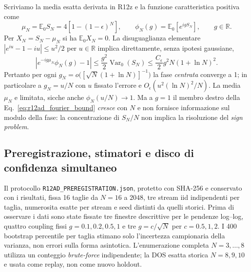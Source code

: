 \documentclass[11pt,a4paper]{article}
\begin{document}
Scriviamo la media esatta derivata in R12z e la funzione caratteristica positiva come
\begin{equation}
 \mu_N=\mathbb E_0 S_N=4[1-(1-\epsilon)^N],\qquad
 \phi_N(g)=\mathbb E_0[e^{igS_N}],\qquad g\in\mathbb R.
 \label{eq:r12ad_def}
\end{equation}
Per $X_N=S_N-\mu_N$ si ha $\mathbb E_0 X_N=0$. La disuguaglianza elementare $|e^{iu}-1-iu|\le u^2/2$ per $u\in\mathbb R$ implica direttamente, senza ipotesi gaussiane,
\begin{equation}
 \boxed{\left|e^{-ig\mu_N}\phi_N(g)-1\right|\le
 \frac{g^2}{2}\operatorname{Var}_0(S_N)
 \le \frac{C_\epsilon}{2}g^2N(1+\ln N)^2.}
 \label{eq:r12ad_fourier_bound}
\end{equation}
Pertanto per ogni $g_N=o\bigl([\sqrt N(1+\ln N)]^{-1}\bigr)$ la fase \emph{centrata} converge a 1; in particolare a $g_N=u/N$ con $u$ fissato l'errore e $O_\epsilon(u^2(\ln N)^2/N)$. La media $\mu_N$ e limitata, sicche anche $\phi_N(u/N)\to1$. Ma a $g=1$ il membro destro della Eq.~\eqref{eq:r12ad_fourier_bound} \emph{cresce} con $N$ e non fornisce informazione sul modulo della fase: la concentrazione di $S_N/N$ non implica la risoluzione del \emph{sign problem}.

\subsection{Preregistrazione, stimatori e disco di confidenza simultaneo}

Il protocollo \texttt{R12AD\_PREREGISTRATION.json}, protetto con SHA-256 e conservato con i risultati, fissa 16 taglie da $N=16$ a $2048$, tre stream iid indipendenti per taglia, numerosita esatte per stream e seed distinti da quelli storici. Prima di osservare i dati sono state fissate tre finestre descrittive per le pendenze log--log, quattro coupling fissi $g=0.1,0.2,0.5,1$ e tre $g=c/\sqrt N$ per $c=0.5,1,2$. I 400 bootstrap percentile per taglia stimano solo l'incertezza campionaria della varianza, non errori sulla forma asintotica. L'enumerazione completa $N=3,\ldots,8$ utilizza un conteggio \emph{brute-force} indipendente; la DOS esatta storica $N=8,9,10$ e usata come replay, non come nuovo holdout.
\end{document}

